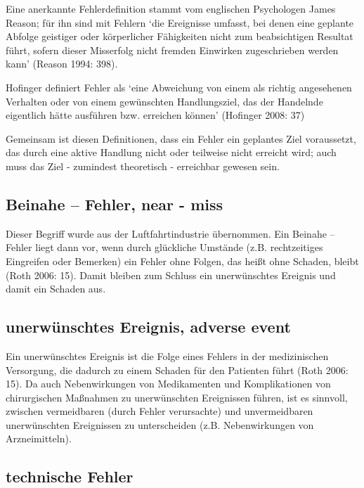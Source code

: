 Eine anerkannte Fehlerdefinition stammt vom englischen
Psychologen James Reason; für ihn sind mit Fehlern \enquote*{die
Ereignisse umfasst, bei denen eine geplante Abfolge
geistiger oder körperlicher Fähigkeiten nicht zum
beabsichtigen Resultat führt, sofern dieser Misserfolg
nicht fremden Einwirken zugeschrieben werden kann} (Reason
1994: 398).




Hofinger definiert Fehler als \enquote*{eine Abweichung von einem als
richtig angesehenen Verhalten oder von einem gewünschten
Handlungsziel, das der Handelnde eigentlich hätte ausführen
bzw. erreichen können} (Hofinger 2008: 37)




Gemeinsam ist diesen Definitionen, dass ein Fehler ein
geplantes Ziel voraussetzt, das durch eine aktive Handlung
nicht oder teilweise nicht erreicht wird; auch muss das
Ziel - zumindest theoretisch - erreichbar gewesen sein.




\subsection{Beinahe – Fehler, near - miss}

Dieser Begriff wurde aus der Luftfahrtindustrie übernommen.
Ein Beinahe – Fehler liegt dann vor, wenn durch glückliche
Umstände (z.B. rechtzeitiges Eingreifen oder Bemerken) ein
Fehler ohne Folgen, das heißt ohne Schaden, bleibt (Roth
2006: 15). Damit bleiben zum Schluss ein unerwünschtes
Ereignis und damit ein Schaden aus.




\subsection{unerwünschtes Ereignis, adverse event}

Ein unerwünschtes Ereignis ist die Folge eines Fehlers in
der medizinischen Versorgung, die dadurch zu einem Schaden
für den Patienten führt (Roth 2006: 15). Da auch
Nebenwirkungen von Medikamenten und Komplikationen von
chirurgischen Maßnahmen zu unerwünschten Ereignissen
führen, ist es sinnvoll, zwischen vermeidbaren (durch
Fehler verursachte) und unvermeidbaren unerwünschten
Ereignissen zu unterscheiden (z.B. Nebenwirkungen von
Arzneimitteln).




\subsection{technische Fehler}

